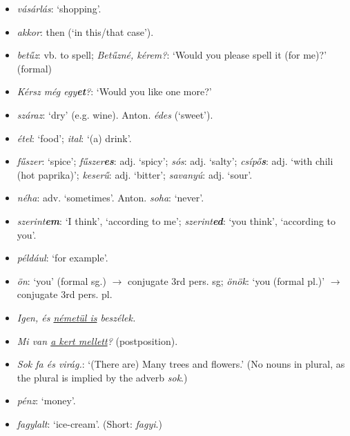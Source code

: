 \documentclass[a4paper,11pt]{article}
\begin{document}
\begin{itemize}
  \item \emph{vásárlás}: `shopping'.

  \item \emph{akkor}: then (`in this/that case').

  \item \emph{betűz}: vb. to spell; \emph{Betűzné, kérem?}:
    `Would you please spell it (for me)?' (formal)

  \item \emph{Kérsz még egy\textbf{et}?}: `Would you like one more?'

  \item \emph{száraz}: `dry' (e.g. wine). Anton. \emph{édes}
    (`sweet').

  \item \emph{étel}: `food'; \emph{ital}: `(a) drink'.

  \item \emph{fűszer}: `spice'; \emph{fűszer\textbf{es}}:
    adj. `spicy'; \emph{sós}: adj. `salty'; \emph{csípő\textbf{s}}:
    adj. `with chili (hot paprika)'; \emph{keserű}: adj. `bitter';
    \emph{savanyú}: adj. `sour'.

  \item \emph{néha}: adv. `sometimes'. Anton. \emph{soha}: `never'.

  \item \emph{szerint\textbf{em}}: `I think', `according to me';
    \emph{szerint\textbf{ed}}: `you think', `according to you'.

  \item \emph{például}: `for example'.

  \item \emph{ön}: `you' (formal sg.) $\rightarrow$ conjugate 3rd
    pers. sg; \emph{önök}: `you (formal pl.)' $\rightarrow$ conjugate
    3rd pers. pl.

  \item \emph{Igen, és \underline{németül is} beszélek.}

  \item \emph{Mi van \underline{a kert mellett}?} (postposition).

  \item \emph{Sok fa és virág.}: `(There are) Many trees and flowers.'
    (No nouns in plural, as the plural is implied by the adverb
    \emph{sok}.)

  \item \emph{pénz}: `money'.

  \item \emph{fagylalt}: `ice-cream'. (Short: \emph{fagyi}.)


\end{itemize}
\end{document}
